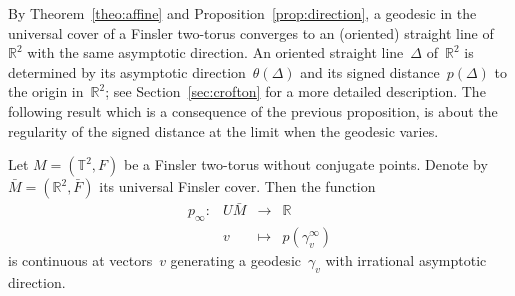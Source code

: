 \documentclass[AHL,Unicode,longabstracts,published]{cedram}
\newcommand{\Z}{\mathbb{Z}}
\newcommand{\R}{\mathbb{R}}
\newcommand{\T}{\mathbb{T}}
\newcommand{\width}{\mathrm{width}}
\begin{document}

By Theorem~\ref{theo:affine} and Proposition~\ref{prop:direction}, a geodesic in the universal cover of a Finsler two-torus converges to an (oriented) straight line of~$\R^2$ with the same asymptotic direction. An oriented straight line~$\Delta$ of~$\R^2$ is determined by its asymptotic direction~$\theta(\Delta)$ and its signed distance~$p(\Delta)$ to the origin in~$\R^2$; see Section~\ref{sec:crofton} for a more detailed description. The following result which is a consequence of the previous proposition, is about the regularity of the signed distance at the limit when the geodesic varies.


\begin{prop}\label{prop:pcontinuous}
Let $M=(\T^2,F)$ be a Finsler two-torus without conjugate points. Denote by~$\bar{M}=(\R^2,\bar{F})$ its universal Finsler cover. Then the function
\[
\begin{array}{rccc}
p_\infty : & U\bar{M} & \to & \R \\
& v & \mapsto & p\left(\gamma_v^\infty\right)
\end{array}
\]
is continuous at vectors~$v$ generating a geodesic~$\gamma_v$ with irrational asymptotic direction.
\end{prop}
\end{document}
